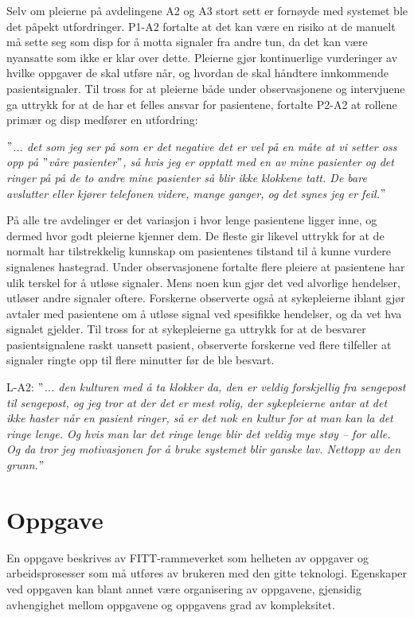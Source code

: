 \noindent
Selv om pleierne på avdelingene A2 og A3 stort sett er fornøyde med systemet ble det påpekt utfordringer. P1-A2 fortalte at det kan være en risiko at de manuelt må sette seg som disp for å motta signaler fra andre tun, da det kan være nyansatte som ikke er klar over dette. Pleierne gjør kontinuerlige vurderinger av hvilke oppgaver de skal utføre når, og hvordan de skal håndtere innkommende pasientsignaler. Til tross for at pleierne både under observasjonene og intervjuene ga uttrykk for at de har et felles ansvar for pasientene, fortalte P2-A2 at rollene primær og disp medfører en utfordring:

\noindent
\textit{$"$... det som jeg ser på som er det negative det er vel på en måte at vi setter oss opp på $"$våre pasienter$"$, så hvis jeg er opptatt med en av mine pasienter og det ringer på på de to andre mine pasienter så blir ikke klokkene tatt. De bare avslutter eller kjører telefonen videre, mange ganger, og det synes jeg er feil.$"$}

\noindent
På alle tre avdelinger er det variasjon i hvor lenge pasientene ligger inne, og dermed hvor godt pleierne kjenner dem. De fleste gir likevel uttrykk for at de normalt har tilstrekkelig kunnskap om pasientenes tilstand til å kunne vurdere signalenes hastegrad. Under observasjonene fortalte flere pleiere at pasientene har ulik terskel for å utløse signaler. Mens noen kun gjør det ved alvorlige hendelser, utløser andre signaler oftere. Forskerne observerte også at sykepleierne iblant gjør avtaler med pasientene om å utløse signal ved spesifikke hendelser, og da vet hva signalet gjelder. Til tross for at sykepleierne ga uttrykk for at de besvarer pasientsignalene raskt uansett pasient, observerte forskerne ved flere tilfeller at signaler ringte opp til flere minutter før de ble besvart.  
  
\noindent
L-A2: \textit{$"$... den kulturen med å ta klokker da, den er veldig forskjellig fra sengepost til sengepost, og jeg tror at der det er mest rolig, der sykepleierne antar at det ikke haster når en pasient ringer, så er det nok en kultur for at man kan la det ringe lenge. Og hvis man lar det ringe lenge blir det veldig mye støy – for alle. Og da tror jeg motivasjonen for å bruke systemet blir ganske lav. Nettopp av den grunn.$"$} 

\section{Oppgave}
En oppgave beskrives av FITT-rammeverket som helheten av oppgaver og arbeidsprosesser som må utføres av brukeren med den gitte teknologi. Egenskaper ved oppgaven kan blant annet være organisering av oppgavene, gjensidig avhengighet mellom oppgavene og oppgavens grad av kompleksitet.


